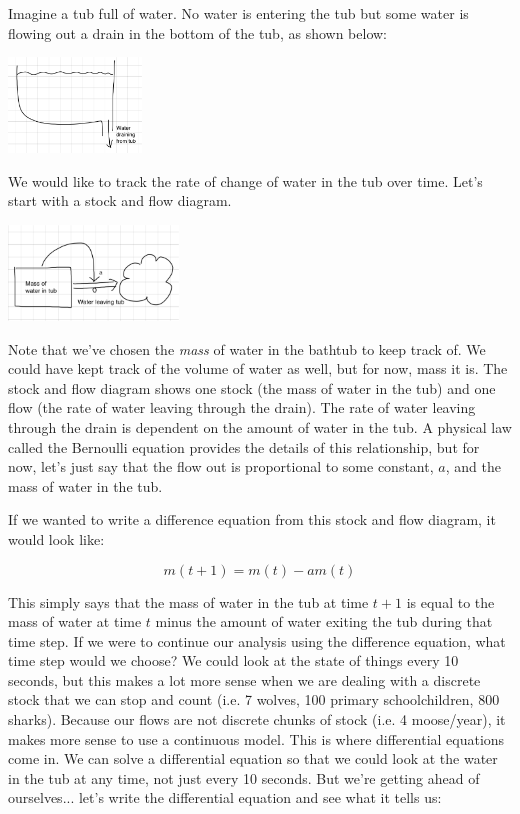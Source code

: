 Imagine a tub full of water. No water is entering the tub but some water is flowing out a drain in the bottom of the tub, as shown below:

\beforefig
\centerline{\includegraphics[height=1in]{figs/Tub1Schematic.png}}
\afterfig

We would like to track the rate of change of water in the tub over time. Let's start with a stock and flow diagram.

\beforefig
\centerline{\includegraphics[height=1in]{figs/Tub1StockandFlow.png}}
\afterfig

Note that we've chosen the {\it mass} of water in the bathtub to keep track of. We could have kept track of the volume of water as well, but for now, mass it is.  The stock and flow diagram shows one stock (the mass of water in the tub) and one flow (the rate of water leaving through the drain). The rate of water leaving through the drain is dependent on the amount of water in the tub.  A physical law called the Bernoulli equation provides the details of this relationship, but for now, let's just say that the flow out is proportional to some constant, $a$, and the mass of water in the tub. 

If we wanted to write a difference equation from this stock and flow diagram, it would look like:

$$ m(t+1)=m(t)-am(t)$$

This simply says that the mass of water in the tub at time $t+1$ is equal to the mass of water at time $t$ minus the amount of water exiting the tub during that time step. If we were to continue our analysis using the difference equation, what time step would we choose? We could look at the state of things every 10 seconds, but this makes a lot more sense when we are dealing with a discrete stock that we can stop and count (i.e. 7 wolves, 100 primary schoolchildren, 800 sharks). Because our flows are not discrete chunks of stock (i.e. 4 moose/year), it makes more sense to use a continuous model. This is where differential equations come in. We can solve a differential equation so that we could look at the water in the tub at any time, not just every 10 seconds. But we're getting ahead of ourselves... let's write the differential equation and see what it tells us:

